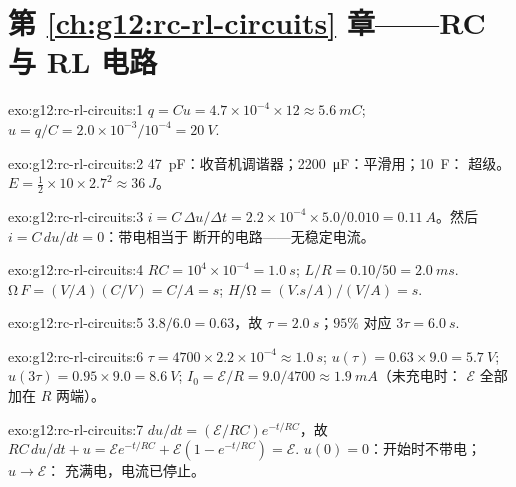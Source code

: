 \section*{第 \ref{ch:g12:rc-rl-circuits} 章——RC 与 RL 电路}

\begin{solution}{exo:g12:rc-rl-circuits:1}
$q = Cu = 4.7\times10^{-4} \times 12 \approx \qty{5.6}{mC}$;
$u = q/C = 2.0\times10^{-3}/10^{-4} = \qty{20}{V}$.
\end{solution}

\begin{solution}{exo:g12:rc-rl-circuits:2}
\qty{47}{pF}：收音机调谐器；\qty{2200}{\micro F}：平滑用；\qty{10}{F}：
超级。$E = \tfrac12 \times 10 \times 2.7^2 \approx \qty{36}{J}$。
\end{solution}

\begin{solution}{exo:g12:rc-rl-circuits:3}
$i = C\,\Delta u/\Delta t = 2.2\times10^{-4} \times 5.0/0.010 =
\qty{0.11}{A}$。然后 $i = C\,du/dt = 0$：带电相当于
断开的电路——无稳定电流。
\end{solution}

\begin{solution}{exo:g12:rc-rl-circuits:4}
$RC = 10^4 \times 10^{-4} = \qty{1.0}{s}$;
$L/R = 0.10/50 = \qty{2.0}{ms}$. $\unit{\ohm}\,\unit{F} =
(\unit{V/A})(\unit{C/V}) = \unit{C/A} = \unit{s}$;
$\unit{H}/\unit{\ohm} = (\unit{V.s/A})/(\unit{V/A}) = \unit{s}$.
\end{solution}

\begin{solution}{exo:g12:rc-rl-circuits:5}
$3.8/6.0 = 0.63$，故 $\tau = \qty{2.0}{s}$；$95\%$ 对应 $3\tau =
\qty{6.0}{s}$.
\end{solution}

\begin{solution}{exo:g12:rc-rl-circuits:6}
$\tau = 4700 \times 2.2\times10^{-4} \approx \qty{1.0}{s}$;
$u(\tau) = 0.63 \times 9.0 = \qty{5.7}{V}$;
$u(3\tau) = 0.95 \times 9.0 = \qty{8.6}{V}$;
$I_0 = \mathcal{E}/R = 9.0/4700 \approx \qty{1.9}{mA}$（未充电时：
$\mathcal{E}$ 全部加在 $R$ 两端）。
\end{solution}

\begin{solution}{exo:g12:rc-rl-circuits:7}
$du/dt = (\mathcal{E}/RC)e^{-t/RC}$，故 $RC\,du/dt + u =
\mathcal{E}e^{-t/RC} + \mathcal{E}(1 - e^{-t/RC}) = \mathcal{E}$.
$u(0) = 0$：开始时不带电；$u \to \mathcal{E}$：
充满电，电流已停止。
\end{solution}

